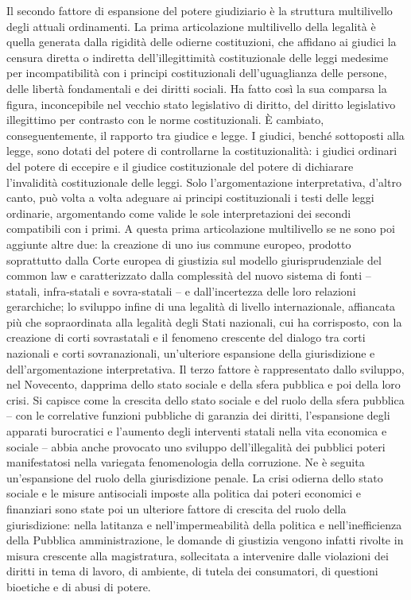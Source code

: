 Il secondo fattore di espansione del potere giudiziario è la struttura multilivello degli attuali ordinamenti. La prima articolazione multilivello della legalità è quella generata dalla rigidità delle odierne costituzioni, che affidano ai giudici la censura diretta o indiretta dell’illegittimità costituzionale delle leggi medesime per incompatibilità con i principi costituzionali dell’uguaglianza delle persone, delle libertà fondamentali e dei diritti sociali. Ha fatto così la sua comparsa la figura, inconcepibile nel vecchio stato legislativo di diritto, del diritto legislativo illegittimo per contrasto con le norme costituzionali. È cambiato, conseguentemente, il rapporto tra giudice e legge. I giudici, benché sottoposti alla legge, sono dotati del potere di controllarne la costituzionalità: i giudici ordinari del potere di eccepire e il giudice costituzionale del potere di dichiarare l’invalidità costituzionale delle leggi. Solo l’argomentazione interpretativa, d’altro canto, può volta a volta adeguare ai principi costituzionali i testi delle leggi ordinarie, argomentando come valide le sole interpretazioni dei secondi compatibili con i primi. A questa prima articolazione multilivello se ne sono poi aggiunte altre due: la creazione di uno ius commune europeo, prodotto soprattutto dalla Corte europea di giustizia sul modello giurisprudenziale del common law e caratterizzato dalla complessità del nuovo sistema di fonti – statali, infra-statali e sovra-statali – e dall’incertezza delle loro relazioni gerarchiche; lo sviluppo infine di una legalità di livello internazionale, affiancata più che sopraordinata alla legalità degli Stati nazionali, cui ha corrisposto, con la creazione di corti sovrastatali e il fenomeno crescente del dialogo tra corti nazionali e corti sovranazionali, un’ulteriore espansione della giurisdizione e dell’argomentazione interpretativa.
Il terzo fattore è rappresentato dallo sviluppo, nel Novecento, dapprima dello stato sociale e della sfera pubblica e poi della loro crisi. Si capisce come la crescita dello stato sociale e del ruolo della sfera pubblica – con le correlative funzioni pubbliche di garanzia dei diritti, l’espansione degli apparati burocratici e l’aumento degli interventi statali nella vita economica e sociale – abbia anche provocato uno sviluppo dell’illegalità dei pubblici poteri manifestatosi nella variegata fenomenologia della corruzione. Ne è seguita un’espansione del ruolo della giurisdizione penale. La crisi odierna dello stato sociale e le misure antisociali imposte alla politica dai poteri economici e finanziari sono state poi un ulteriore fattore di crescita del ruolo della giurisdizione: nella latitanza e nell’impermeabilità della politica e nell’inefficienza della Pubblica amministrazione, le domande di giustizia vengono infatti rivolte in misura crescente alla magistratura, sollecitata a intervenire dalle violazioni dei diritti in tema di lavoro, di ambiente, di tutela dei consumatori, di questioni bioetiche e di abusi di potere.
